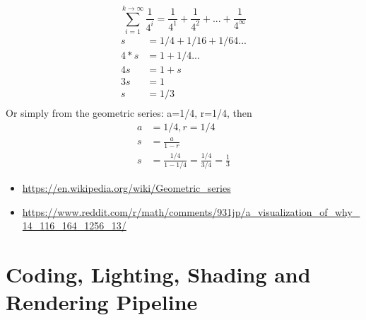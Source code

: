 \documentclass[a4paper,10pt]{article}
\begin{document}
\[\sum_{i=1}^{k\rightarrow\infty}\frac{1}{4^i}=\frac{1}{4^1}+\frac{1}{4^2}+...+\frac{1}{4^\infty}
\]
\[
\begin{aligned}
s&=1/4+1/16+1/64...\\
4*s&=1+1/4...\\
4s&=1+s\\
3s&=1\\
s&=1/3\\
\end{aligned}
\]
Or simply from the geometric series: a=1/4, r=1/4,
then 
\[
\begin{aligned}
a&=1/4, r=1/4\\
s&=\frac{a}{1-r}\\
s&=\frac{1/4}{1-1/4}=\frac{1/4}{3/4}=\frac{1}{3}
\end{aligned}\]

\begin{itemize}
	\item \url{https://en.wikipedia.org/wiki/Geometric_series}
	\item \url{
		https://www.reddit.com/r/math/comments/931jp/a_visualization_of_why_14_116_164_1256_13/}
\end{itemize}
\section{Coding, Lighting, Shading and Rendering Pipeline}
\end{document}
